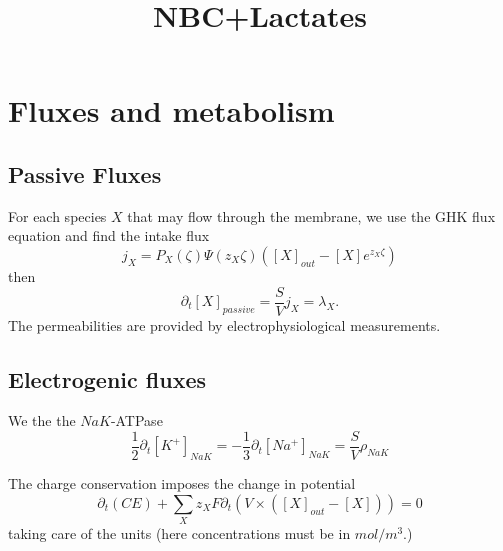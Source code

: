 \documentclass{revtex4}
\begin{document}
\title{NBC+Lactates}
\maketitle

\section{Fluxes and metabolism}

\subsection{Passive Fluxes}
For each species $X$ that may flow through the membrane, we use the GHK flux equation and find the intake flux
\begin{equation}
	j_X =  P_X\left(\zeta\right) \Psi(z_X\zeta)
	\left([X]_{out} - [X]e^{z_X\zeta}\right)
\end{equation}
then
\begin{equation}
	\partial_t [X]_{passive} = \dfrac{S}{V} j_X = \lambda_X.
\end{equation}
The permeabilities are provided by electrophysiological measurements.

\subsection{Electrogenic fluxes}
We the the $NaK$-ATPase
\begin{equation}
	\dfrac{1}{2} \partial_t \left[K^+\right]_{{NaK}} = -\dfrac{1}{3} \partial_t \left[ Na^+\right]_{{NaK}}
	= \dfrac{S}{V}\rho_{NaK}
\end{equation}

The charge conservation imposes the change in potential
\begin{equation}
	\partial_t\left( C E\right) + \sum_X z_X F \partial_t\left( V \times  (\left[X\right]_{out}-\left[X\right]) \right) = 0
\end{equation}
taking care of the units (here concentrations must be in $mol/m^3$.)
\end{document}
